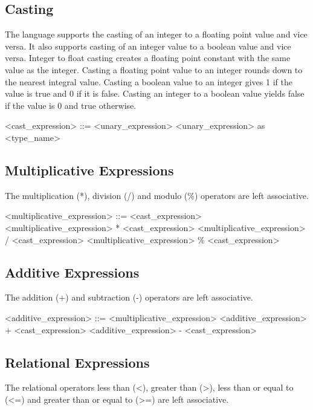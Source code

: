 \subsection{Casting}
The \lepix{} language supports the casting of an integer to a floating point value and vice versa. It also supports casting of an integer value to a boolean value and vice versa. Integer to float casting creates a floating point constant with the same value as the integer. Casting a floating point value to an integer rounds down to the nearest integral value. Casting a boolean value to an integer gives 1 if the value is true and 0 if it is false. Casting an integer to a boolean value yields false if the value is 0 and true otherwise. 

\begin{grammar}
<cast_expression> ::= <unary_expression>
\alt <unary_expression> as <type_name>
\end{grammar}

\subsection{Multiplicative Expressions}
The multiplication (*), division (/) and modulo (\%) operators are left associative.

\begin{grammar}
<multiplicative_expression> ::= <cast_expression>
\alt <multiplicative_expression> * <cast_expression>
\alt <multiplicative_expression> / <cast_expression>
\alt <multiplicative_expression> \% <cast_expression>
\end{grammar}

\subsection{Additive Expressions}
The addition (+) and subtraction  (-) operators are left associative.

\begin{grammar}
<additive_expression> ::= <multiplicative_expression>
\alt <additive_expression> + <cast_expression>
\alt <additive_expression> - <cast_expression>
\end{grammar}

\subsection{Relational Expressions}
The relational operators less than (<), greater than (>), less than or equal to (<=) and greater than or equal to (>=) are left associative. 

